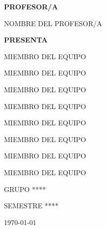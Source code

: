 \documentclass[12pt,letterpaper]{article}                       %
\begin{document}
\begin{titlepage}
    \vfill                                                          %
    {\bfseries\Large PROFESOR/A \par}                               %
    \vspace{0.1cm}                                                  %
    {\large NOMBRE DEL PROFESOR/A \par}                             %

    \vfill                                                          %
    {\bfseries\Large PRESENTA \par}                                 %
    \vspace{0.1cm}                                                  %
    {\large MIEMBRO DEL EQUIPO \par}
    {\large MIEMBRO DEL EQUIPO \par}
    {\large MIEMBRO DEL EQUIPO \par}
    {\large MIEMBRO DEL EQUIPO \par}
    {\large MIEMBRO DEL EQUIPO \par}
    {\large MIEMBRO DEL EQUIPO \par}
    {\large MIEMBRO DEL EQUIPO \par}
    {\large MIEMBRO DEL EQUIPO \par}

    \vfill                                                          %
    {\Large GRUPO **** \par}                                        %

    \vfill                                                          %
    {\Large SEMESTRE **** \par}                                     %

    \vfill                                                          %
    {\Large \today \par}                                            %

\end{titlepage}
\end{document}
